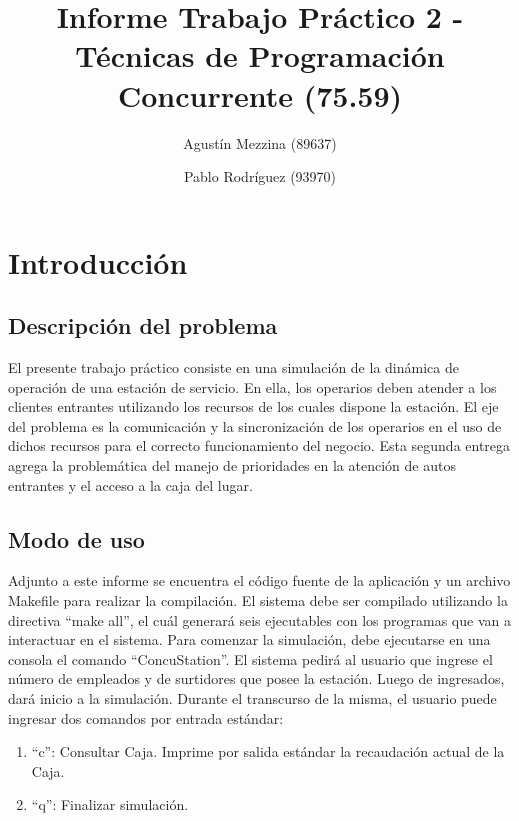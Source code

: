 \documentclass{article}
\begin{document}
\title{Informe Trabajo Práctico 2 - Técnicas de Programación Concurrente (75.59)}
\author{Agustín Mezzina (89637)\\
	\and
        Pablo Rodríguez (93970)}
\maketitle

\tableofcontents
\clearpage

\section{Introducción}
\subsection{Descripción del problema}
El presente trabajo práctico consiste en una simulación de la dinámica de operación de una estación de servicio. En ella, los operarios deben atender a los clientes entrantes utilizando los recursos de los cuales dispone la estación. El eje del problema es la comunicación y la sincronización de los operarios en el uso de dichos recursos para el correcto funcionamiento del negocio.
Esta segunda entrega agrega la problemática del manejo de prioridades en la atención de autos entrantes y el acceso a la caja del lugar.
\subsection{Modo de uso}
Adjunto a este informe se encuentra el código fuente de la aplicación y un archivo Makefile para realizar la compilación. El sistema debe ser compilado utilizando la directiva ``make all'', el cuál generará seis ejecutables con los programas que van a interactuar en el sistema.
Para comenzar la simulación, debe ejecutarse en una consola el comando ``ConcuStation''.
El sistema pedirá al usuario que ingrese el número de empleados y de surtidores que posee la estación. Luego de ingresados, dará inicio a la simulación.
Durante el transcurso de la misma, el usuario puede ingresar dos comandos por entrada estándar:
\begin{enumerate}
	\item ``c'': Consultar Caja. Imprime por salida estándar la recaudación actual de la Caja.
	\item ``q'': Finalizar simulación.
\end{enumerate}
\end{document}
